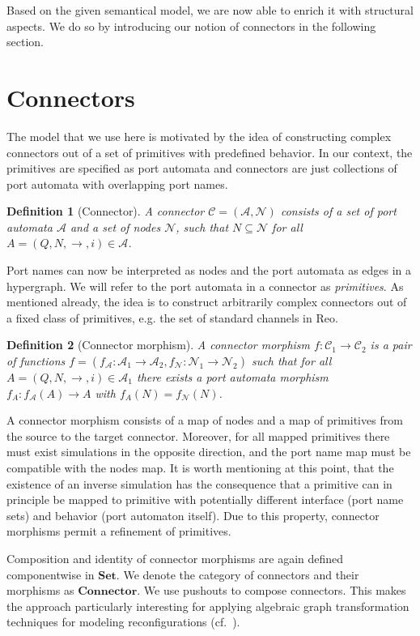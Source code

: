 \documentclass[copyright,creativecommons]{eptcs}
\newtheorem{definition}{Definition}
\newcommand{\Set}{\ensuremath{\mathbf{Set}}}
\newcommand{\Connector}{\ensuremath{\mathbf{Connector}}}
\newcommand{\N}{\ensuremath{\mathcal{N}}}
\newcommand{\A}{\ensuremath{\mathcal{A}}}
\newcommand{\C}{\ensuremath{\mathcal{C}}}
\begin{document}
Based on the given semantical model, we are now able to enrich it
with structural aspects. We do so by introducing our notion of 
connectors in the following section.

 

\section{Connectors}
\label{sec:connectors}

The model that we use here is motivated by the 
idea of constructing complex connectors out of 
a set of primitives with predefined behavior.
In our context, the primitives are specified
as port automata and connectors are just
collections of port automata with overlapping
port names.
\begin{definition}[Connector] \label{def:connector}
A connector $\C = (\A,\N) $ consists of a set of port 
automata $\A$ and a set of nodes $\N$, such that $N \subseteq \N$ for all
$A=(Q,N,\to,i)\in \A$.
\end{definition}
Port names can now be interpreted as nodes and the port automata
as edges in a hypergraph. We will refer to the port automata
in a connector as \emph{primitives}. As mentioned already,
the idea is to construct arbitrarily complex connectors 
out of a fixed class of primitives, e.g. the set of 
standard channels in Reo.
\begin{definition}[Connector morphism] \label{def:connector-morphism}
A connector morphism $f: \C_1 \to \C_2$ is a pair of functions
$f = (f_\A: \A_1 \to \A_2, f_\N : \N_1 \to \N_2)$
such that for all $A=(Q,N,\to,i) \in \A_1$ there exists a port automata
morphism $f_A: f_\A(A) \to A$ with $f_A(N)=f_\N(N)$.
\end{definition}
A connector morphism consists of a map of nodes and a map of primitives 
from the source to the target connector.
Moreover, for all mapped primitives there must exist simulations in the
opposite direction, and the port name map must be compatible with the
nodes map.
It is worth mentioning at this point, that the existence of 
an inverse simulation has the consequence that a primitive can 
in principle be mapped to primitive with potentially
different interface (port name sets) and behavior 
(port automaton itself). Due to this property, connector morphisms 
permit a refinement of primitives.

Composition and identity of connector morphisms are again defined 
componentwise in \Set. We denote the category of connectors and their
morphisms as {\Connector}. 
We use pushouts to compose connectors. This makes the approach particularly
interesting for applying algebraic graph transformation techniques for modeling
reconfigurations (cf.~\cite{KMLA10,KAV09}). 
\end{document}
